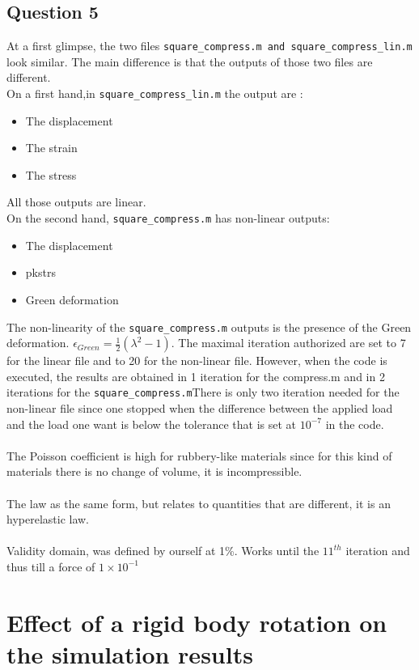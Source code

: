 \documentclass[12pt,a4paper]{article}
\begin{document}
\subsection*{Question 5}
At a first glimpse, the two files \verb|square_compress.m and square_compress_lin.m| look similar.
The main difference is that the outputs of those two files are different. 
\\On a first hand,in \verb|square_compress_lin.m| the output are :
\begin{itemize}
\item The displacement
\item The strain
\item The stress
\end{itemize}
All those outputs are linear.
\\On the second hand, \verb|square_compress.m| has non-linear outputs:
\begin{itemize}
\item The displacement
\item pkstrs
\item Green deformation
\end{itemize}
The non-linearity of the \verb|square_compress.m| outputs is the presence of the Green deformation.
$\epsilon_{Green}=\frac{1}{2}(\lambda^2 -1)$.
The maximal iteration authorized are set to 7 for the linear file and to 20 for the non-linear file. However, when the code is executed, the results are obtained in 1 iteration for the compress.m and in 2 iterations for the \verb|square_compress.m|There is only two iteration needed for the non-linear file since one stopped when the difference between the applied load and the load one want is below the tolerance that is set at $10^{-7}$ in the code.
\\
\\The Poisson coefficient is high for rubbery-like materials since for this kind of materials there is no change of volume, it is incompressible.
\\
\\The law as the same form, but relates to quantities that are different, it is an hyperelastic law.
\\
\\Validity domain, was defined by ourself at 1\%. Works until the $11^{th}$ iteration and thus till a force of $1\times 10^{-1}$

\section*{Effect of a rigid body rotation on the simulation results}
\end{document}
